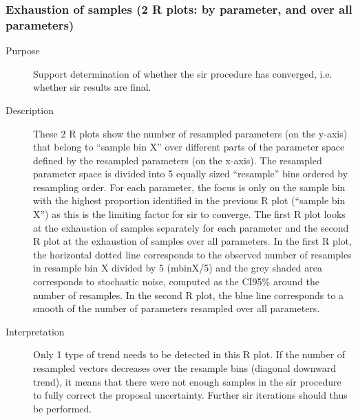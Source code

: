 \subsubsection{Exhaustion of samples (2 R plots: by parameter, and over all parameters)}
\begin{description}
\item[Purpose] Support determination of whether the sir procedure has converged, i.e. whether sir results are final.
\item[Description] These 2 R plots show the number of resampled parameters (on the y-axis) that belong to “sample bin X” over different parts of the parameter space defined by the resampled parameters (on the x-axis). The resampled parameter space is divided into 5 equally sized “resample” bins ordered by resampling order. For each parameter, the focus is only on the sample bin with the highest proportion identified in the previous R plot (“sample bin X”) as this is the limiting factor for sir to converge. The first R plot looks at the exhaustion of samples separately for each parameter and the second R plot at the exhaustion of samples over all parameters. In the first R plot, the horizontal dotted line corresponds to the observed number of resamples in resample bin X divided by 5 (mbinX/5) and the grey shaded area corresponds to stochastic noise, computed as the CI95\% around the number of resamples. In the second R plot, the blue line corresponds to a smooth of the number of parameters resampled over all parameters.
\item[Interpretation] Only 1 type of trend needs to be detected in this R plot. If the number of resampled vectors decreases over the resample bins (diagonal downward trend), it means that there were not enough samples in the sir procedure to fully correct the proposal uncertainty. Further sir iterations should thus be performed.
\end{description}


